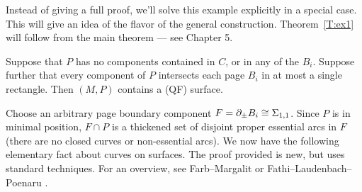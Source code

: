 Instead of giving a full proof, we'll solve this example explicitly in
a special case.  This will give an idea of the flavor of the general
construction. Theorem~\ref{T:ex1} will follow from the main theorem --- see
Chapter 5.

\begin{thm}\label{T:ex1'}

Suppose that $P$ has no components contained in $C$, or in any of the $B_i$.
Suppose further that every component of $P$ intersects each page $B_i$ in at
most a single rectangle. Then $(M,P)$ contains a (QF) surface.

\end{thm}

Choose an arbitrary page boundary component $F=\partial_\pm B_i \cong \Sigma_{1,1}$.
Since $P$ is in minimal position, $F \cap P$ is a thickened set of disjoint
proper essential arcs in $F$ (there are no closed curves or non-essential
arcs).  We now have the following elementary fact about curves on surfaces.
The proof provided is new, but uses standard techniques.  For an overview, see
Farb--Margalit \cite{FM} or Fathi--Laudenbach--Poenaru \cite{FLP}.

